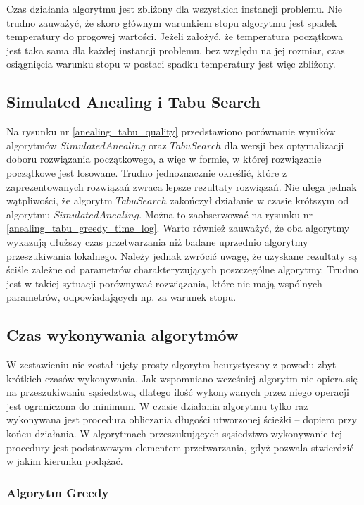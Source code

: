 Czas działania algorytmu jest zbliżony dla wszystkich instancji problemu.
Nie trudno zauważyć, że skoro głównym warunkiem stopu algorytmu jest
spadek temperatury do progowej wartości. Jeżeli założyć, że temperatura
początkowa jest taka sama dla każdej instancji problemu, bez względu
na jej rozmiar, czas osiągnięcia warunku stopu w postaci spadku
temperatury jest więc zbliżony.

\subsection {Simulated Anealing i Tabu Search}

Na rysunku nr \ref{anealing_tabu_quality} przedstawiono porównanie
wyników algorytmów $Simulated Anealing$ oraz $Tabu Search$ dla wersji
bez optymalizacji doboru rozwiązania początkowego, a więc w
formie, w której rozwiązanie początkowe jest losowane. Trudno
jednoznacznie określić, które z zaprezentowanych rozwiązań zwraca
lepsze rezultaty rozwiązań. Nie ulega jednak wątpliwości, że
algorytm $Tabu Search$ zakończył działanie w czasie krótszym od
algorytmu $Simulated Anealing$. Można to zaobserwować na rysunku nr
\ref{anealing_tabu_greedy_time_log}. Warto również zauważyć, że oba
algorytmy wykazują dłuższy czas przetwarzania niż badane uprzednio
algorytmy przeszukiwania lokalnego. Należy jednak zwrócić uwagę,
że uzyskane rezultaty są ściśle zależne od parametrów charakteryzujących
poszczególne algorytmy. Trudno jest w takiej sytuacji porównywać
rozwiązania, które nie mają wspólnych parametrów, odpowiadających np.
za warunek stopu.


\subsection{Czas wykonywania algorytmów}

W zestawieniu nie został ujęty prosty algorytm heurystyczny z
powodu zbyt krótkich czasów wykonywania. Jak wspomniano wcześniej
algorytm nie opiera się na przeszukiwaniu sąsiedztwa, dlatego
ilość wykonywanych przez niego operacji jest ograniczona do
minimum. W czasie działania algorytmu tylko raz wykonywana
jest procedura obliczania długości utworzonej ścieżki -- dopiero
przy końcu działania. W algorytmach przeszukujących sąsiedztwo
wykonywanie tej procedury jest podstawowym elementem przetwarzania,
gdyż pozwala stwierdzić w jakim kierunku podążać.


\subsubsection{Algorytm Greedy}

